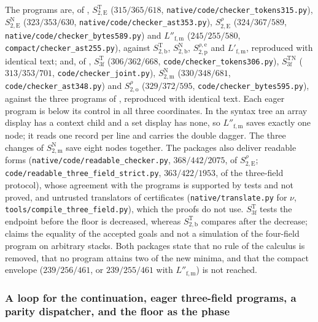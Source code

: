 The programs are, of , $S^{\mathrm T}_{2,\mathrm E}$
($315/365/618$, \texttt{native/code/checker\_tokens315.py}), $S^{\mathrm N}_{2,\mathrm E}$
($323/353/630$, \texttt{native/code/checker\_ast353.py}), $S^{\rho}_{2,\mathrm E}$
($324/367/589$, \texttt{native/code/checker\_bytes589.py}) and $L''_{\mathrm{f,m}}$
($245/255/580$, \texttt{compact/checker\_ast255.py}), against
$S^{\mathrm T}_{2,\mathrm b}$, $S^{\mathrm N}_{2,\mathrm b}$,
$S^{\rho,\mathrm e}_{2,\mathrm p}$ and $L'_{\mathrm{f,m}}$, reproduced with identical
text; and, of , $S^{\mathrm T}_{3\mathrm f}$
($306/362/668$, \texttt{code/checker\_tokens306.py}), $S^{\mathrm{TN}}_{3\mathrm f}$
($313/353/701$, \texttt{code/checker\_joint.py}), $S^{\mathrm N}_{2,\mathrm m}$
($330/348/681$, \texttt{code/checker\_ast348.py}) and $S^{\rho}_{2,\mathrm o}$
($329/372/595$, \texttt{code/checker\_bytes595.py}), against the three programs of
, reproduced with identical text. Each eager program
is below its control in all three coordinates. In the syntax tree an array display
has a context child and a set display has none, so $L''_{\mathrm{f,m}}$ saves exactly
one node; it reads one record per line and carries the double dagger. The three
changes of $S^{\mathrm N}_{2,\mathrm m}$ save eight nodes together. The packages also
deliver readable forms (\texttt{native/code/readable\_checker.py}, $368/442/2075$, of
$S^{\rho}_{2,\mathrm E}$; \texttt{code/readable\_three\_field\_strict.py},
$363/422/1953$, of the three-field protocol), whose agreement with the programs is
supported by tests and not proved, and untrusted translators of certificates
(\texttt{native/translate.py} for $\nu$, \texttt{tools/compile\_three\_field.py}),
which the proofs do not use. $S^{\mathrm T}_{3\mathrm f}$ tests the endpoint before the
floor is decreased, whereas $S^{\mathrm T}_{2,\mathrm b}$ compares after the decrease;
 claims the equality of the accepted goals and not a
simulation of the four-field program on arbitrary stacks. Both packages state that no
rule of the calculus is removed, that no program attains two of the new minima, and
that the compact envelope ($239/256/461$, or $239/255/461$ with $L''_{\mathrm{f,m}}$)
is not reached.

\subsubsection*{A loop for the continuation, eager three-field programs, a parity dispatcher, and the floor as the phase}


